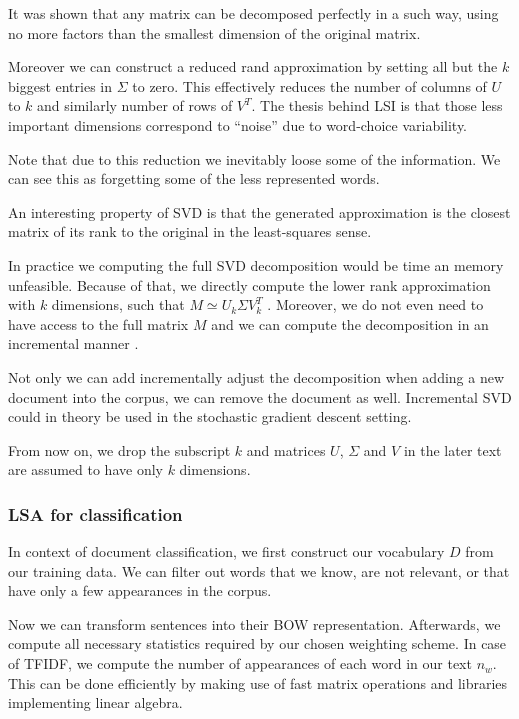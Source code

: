     It was shown that any matrix can be decomposed perfectly in a such way, using no more factors than the smallest dimension of the original matrix.
    
    Moreover we can construct a reduced rand approximation by setting all but the $k$ biggest entries in $\Sigma$ to zero. 
    This effectively reduces the number of columns of $U$ to $k$ and similarly number of rows of $V^T$.
    The thesis behind LSI is that those less important dimensions correspond to “noise” due to word-choice variability.
    
    Note that due to this reduction we inevitably loose some of the information. 
    We can see this as forgetting some of the less represented words.

    An interesting property of SVD is that the generated approximation is the closest matrix of its rank to the original in the least-squares sense.

    In practice we computing the full SVD decomposition would be time an memory unfeasible.
    Because of that, we directly compute the lower rank approximation with $k$ dimensions,
    such that $M \simeq U_k \Sigma V_k^T$ \cite{halko2011finding}. %
    Moreover, we do not even need to have access to the full matrix $M$ and we can compute the decomposition in an incremental manner \cite{brand2006fast}. %
    
    Not only we can add incrementally adjust the decomposition when adding a new document into the corpus, we can remove the document as well.
    Incremental SVD could in theory be used in the stochastic gradient descent setting.
    
    From now on, we drop the subscript $k$ and matrices $U$, $\Sigma$ and $V$ in the later text are assumed to have only $k$ dimensions.
    
    
    \subsubsection{LSA for classification}
    
    In context of document classification, we first construct our vocabulary $D$ from our training data. 
    We can filter out words that we know, are not relevant, or that have only a few appearances in the corpus.
    
    Now we can transform sentences into their BOW representation.
    Afterwards, we compute all necessary statistics required by our chosen weighting scheme. 
    In case of TFIDF, we compute the number of appearances of each word in our text $n_w$. 
    This can be done efficiently by making use of fast matrix operations and libraries implementing linear algebra.
    

